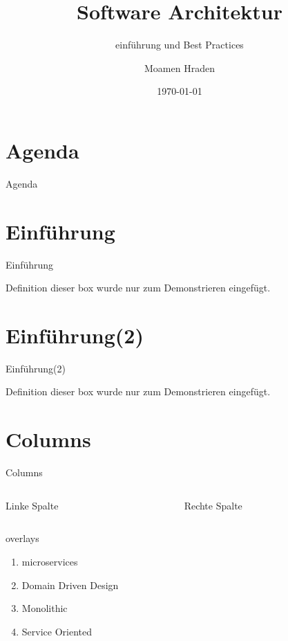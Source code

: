 \documentclass{beamer}
\title{Software Architektur}
\subtitle{einführung und Best Practices}
\author{Moamen Hraden}
\date{\today}
\begin{document}
	\begingroup
	\makeatletter
	\setlength{\hoffset}{.5\beamer@sidebarwidth}
	\makeatother
	\begin{frame}[plain]
    \titlepage
	\end{frame}
	\endgroup
	
	
	\section{Agenda}
	\begin{frame}{Agenda}
    \tableofcontents
	\end{frame}

	
	
	
	\section{Einführung}	
	\begin{frame}{Einführung}
		\begin{block}{Definition}
			dieser box wurde nur zum Demonstrieren eingefügt.
		\end{block}
	\end{frame}
	
	\section{Einführung(2)}
	\begin{frame}{Einführung(2)}
		\begin{alertblock}{Definition}
			dieser box wurde nur zum Demonstrieren eingefügt.
		\end{alertblock}
	\end{frame}
	
	\section{Columns}
	\begin{frame}{Columns}
		\begin{columns}
			\begin{column}{5cm}
				Linke Spalte
			\end{column}
			\begin{column}{5cm}
				Rechte Spalte
			\end{column}
		\end{columns}
	\end{frame}
	
	\begin{frame}{overlays}
		\begin{enumerate}
			\item microservices 
			\pause
			\item Domain Driven Design
			\pause 
			\item Monolithic
			\pause
			\item Service Oriented
		\end{enumerate}
	\end{frame}
	
\end{document}
